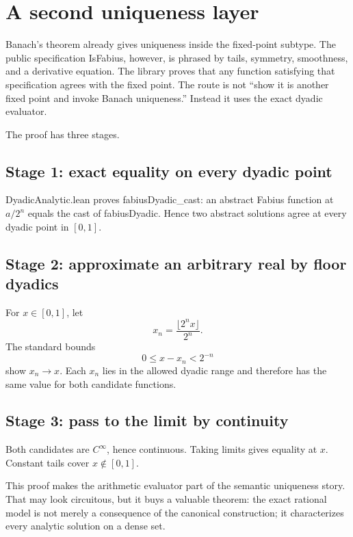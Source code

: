 \documentclass[11pt,a4paper,openany]{book}
\def\module#1{#1.lean}
\def\decl#1{#1}
\newcommand{\module}[1]{\nolinkurl{#1.lean}}
\newcommand{\decl}[1]{\texttt{\detokenize{#1}}}
\begin{document}
\section{A second uniqueness layer}
Banach's theorem already gives uniqueness inside the fixed-point subtype.  The
public specification \decl{IsFabius}, however, is phrased by tails, symmetry,
smoothness, and a derivative equation.  The library proves that any function
satisfying that specification agrees with the fixed point.  The route is
not “show it is another fixed point and invoke Banach uniqueness.”  Instead it
uses the exact dyadic evaluator.

The proof has three stages.

\subsection{Stage 1: exact equality on every dyadic point}
\module{DyadicAnalytic} proves
\decl{fabiusDyadic_cast}: an abstract Fabius function at $a/2^n$ equals the
cast of \decl{fabiusDyadic}.  Hence two abstract solutions agree at every
dyadic point in $[0,1]$.

\subsection{Stage 2: approximate an arbitrary real by floor dyadics}
For $x\in[0,1]$, let
\[
 x_n=\frac{\lfloor 2^n x\rfloor}{2^n}.
\]
The standard bounds
\[
 0\le x-x_n<2^{-n}
\]
show $x_n\to x$.  Each $x_n$ lies in the allowed dyadic range and therefore
has the same value for both candidate functions.

\subsection{Stage 3: pass to the limit by continuity}
Both candidates are $C^\infty$, hence continuous.  Taking limits gives equality
at $x$.  Constant tails cover $x\notin[0,1]$.

\begin{engineering}
This proof makes the arithmetic evaluator part of the semantic uniqueness
story.  That may look circuitous, but it buys a valuable theorem: the exact
rational model is not merely a consequence of the canonical construction; it
characterizes every analytic solution on a dense set.
\end{engineering}
\end{document}
